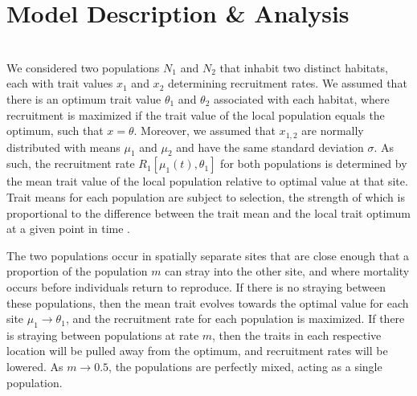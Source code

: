 \documentclass{revtex4}
\begin{document}



\section{Model Description \& Analysis}

\\
\noindent We considered two populations $N_1$ and $N_2$ that inhabit two distinct habitats, each with trait values $x_1$ and $x_2$ determining recruitment rates.
We assumed that there is an optimum trait value $\theta_1$ and $\theta_2$ associated with each habitat, where recruitment is maximized if the trait value of the local population equals the optimum, such that $x = \theta$.
Moreover, we assumed that $x_{1,2}$ are normally distributed with means $\mu_1$ and $\mu_2$ and have the same standard deviation $\sigma$.
As such, the recruitment rate $R_1[\mu_1(t),\theta_1]$ for both populations is determined by the mean trait value of the local population relative to optimal value at that site.
Trait means for each population are subject to selection, the strength of which is proportional to the difference between the trait mean and the local trait optimum at a given point in time \citep{simpson1953major,Lande:1976ga}.

The two populations occur in spatially separate sites that are close enough that a proportion of the population $m$ can stray into the other site, and where mortality occurs before individuals return to reproduce.
If there is no straying between these populations, then the mean trait evolves towards the optimal value for each site $\mu_1 \rightarrow \theta_1$, and the recruitment rate for each population is maximized.
If there is straying between populations at rate $m$, then the traits in each respective location will be pulled away from the optimum, and recruitment rates will be lowered.
As $m \rightarrow 0.5$, the populations are perfectly mixed, acting as a single population.
\end{document}

